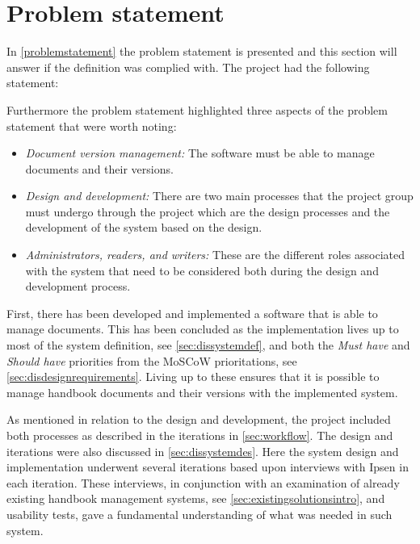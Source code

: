 \section{Problem statement}
In \cref{problemstatement} the problem statement is presented and this section will answer if the definition was complied with.
The project had the following statement:



Furthermore the problem statement highlighted three aspects of the problem statement that were worth noting:

\begin{itemize}
	\item
		\textit{Document version management:}
		The software must be able to manage documents and their versions.
	\item
		\textit{Design and development:}
		There are two main processes that the project group must undergo through the project which are the design processes and the development of the system based on the design.
	\item
		\textit{Administrators, readers, and writers:}
		These are the different roles associated with the system that need to be considered both during the design and development process.

\end{itemize}

First, there has been developed and implemented a software that is able to manage documents.
This has been concluded as the implementation lives up to most of the system definition, see \cref{sec:dissystemdef}, and both the \textit{Must have} and \textit{Should have} priorities from the MoSCoW prioritations, see \cref{sec:disdesignrequirements}.
Living up to these ensures that it is possible to manage handbook documents and their versions with the implemented system.

As mentioned in relation to the design and development, the project included both processes as described in the iterations in \cref{sec:workflow}.
The design and iterations were also discussed in {\color{red}\cref{sec:dissystemdes}}.
Here the system design and implementation underwent several iterations based upon interviews with Ipsen in each iteration.
These interviews, in conjunction with an examination of already existing handbook management systems, see \cref{sec:existingsolutionsintro}, and usability tests, gave a fundamental understanding of what was needed in such system.

